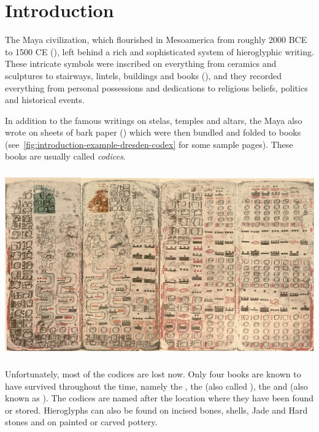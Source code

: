 \documentclass[../main.tex]{subfiles}
\begin{document}
\chapter{Introduction}
The Maya civilization, which flourished in Mesoamerica from roughly 2000 BCE to 1500 CE 
(\cite[3]{estrada-belli2011}), 
left behind a rich and sophisticated system of hieroglyphic writing. 
These intricate symbols were inscribed on everything from ceramics and sculptures to stairways,
lintels, buildings and books (\cite[\ppno~17--27]{thompson1962}), and they recorded everything 
from personal possessions and dedications to religious beliefs, politics and historical events.

In addition to the famous writings on stelas, temples and altars, the Maya also wrote on sheets of 
bark paper (\cite[34\psq]{vonhagen1944}) which were then bundled and 
folded to books (see~\ref{fig:introduction-example-dresden-codex} for some sample pages).
These books are usually called \emph{codices}.
\begin{center}
    \includegraphics[height=8cm,keepaspectratio]{img/example-dresden-codex}
    \label{fig:introduction-example-dresden-codex}
\end{center}
Unfortunately, most of the codices are lost now.
Only four books are known to have survived throughout the time, 
namely the \dresdencodex, the \madridcodex (also called \troanocodex),
the \pariscodex and \mayamexicocodex(also known as \groliercodex).
The codices are named after the location where they have been found or stored.
Hieroglyphs can also be found on incised bones, shells, Jade and Hard stones and on painted or 
carved pottery.
\end{document}
